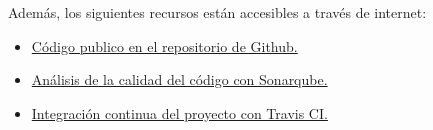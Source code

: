 Además, los siguientes recursos están accesibles a través de internet:

\begin{itemize}
	\tightlist
	\item
	\href{https://github.com/trona85/GII-17.1B-UBULog-1.0}{Código publico en el repositorio de Github.}
	\item
	\href{https://sonarcloud.io/dashboard?id=GII-17.1B-UBULog-1.0}{Análisis de la calidad del código con Sonarqube.}
	\item
	\href{https://travis-ci.org/trona85/GII-17.1B-UBULog-1.0/}{Integración continua del proyecto con Travis CI.}
	
\end{itemize}



